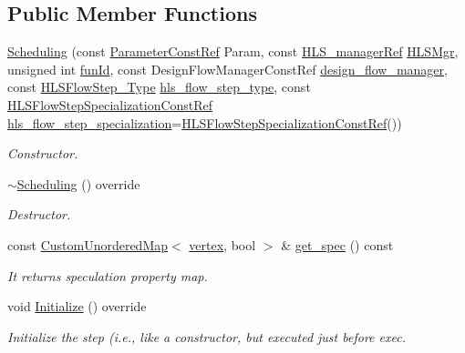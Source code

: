 \subsection*{Public Member Functions}
\begin{DoxyCompactItemize}
\item 
\hyperlink{classScheduling_ab64d824a1d85312cb1ac54ba91bb335f}{Scheduling} (const \hyperlink{Parameter_8hpp_a37841774a6fcb479b597fdf8955eb4ea}{Parameter\+Const\+Ref} Param, const \hyperlink{hls__manager_8hpp_acd3842b8589fe52c08fc0b2fcc813bfe}{H\+L\+S\+\_\+manager\+Ref} \hyperlink{classHLS__step_ade85003a99d34134418451ddc46a18e9}{H\+L\+S\+Mgr}, unsigned int \hyperlink{classHLSFunctionStep_a3e6434fd86c698b0c70520b859bff5b0}{fun\+Id}, const Design\+Flow\+Manager\+Const\+Ref \hyperlink{classDesignFlowStep_ab770677ddf087613add30024e16a5554}{design\+\_\+flow\+\_\+manager}, const \hyperlink{hls__step_8hpp_ada16bc22905016180e26fc7e39537f8d}{H\+L\+S\+Flow\+Step\+\_\+\+Type} \hyperlink{classHLS__step_aefd59af15346ec3f10bf12bd756e6777}{hls\+\_\+flow\+\_\+step\+\_\+type}, const \hyperlink{hls__step_8hpp_a5fdd2edf290c196531d21d68e13f0e74}{H\+L\+S\+Flow\+Step\+Specialization\+Const\+Ref} \hyperlink{classHLS__step_a843be75ba53b81876aa3c8b870ae8a55}{hls\+\_\+flow\+\_\+step\+\_\+specialization}=\hyperlink{hls__step_8hpp_a5fdd2edf290c196531d21d68e13f0e74}{H\+L\+S\+Flow\+Step\+Specialization\+Const\+Ref}())
\begin{DoxyCompactList}\small\item\em Constructor. \end{DoxyCompactList}\item 
\hyperlink{classScheduling_a943ed0dbb41df6925eebb44a33d8f74f}{$\sim$\+Scheduling} () override
\begin{DoxyCompactList}\small\item\em Destructor. \end{DoxyCompactList}\item 
const \hyperlink{custom__map_8hpp_ad1ed68f2ff093683ab1a33522b144adc}{Custom\+Unordered\+Map}$<$ \hyperlink{graph_8hpp_abefdcf0544e601805af44eca032cca14}{vertex}, bool $>$ \& \hyperlink{classScheduling_ada5eff4553c39bf5f6c58e75c86a130b}{get\+\_\+spec} () const
\begin{DoxyCompactList}\small\item\em It returns speculation property map. \end{DoxyCompactList}\item 
void \hyperlink{classScheduling_a178619eced00400e3a023a0b32784f8d}{Initialize} () override
\begin{DoxyCompactList}\small\item\em Initialize the step (i.\+e., like a constructor, but executed just before exec. \end{DoxyCompactList}\end{DoxyCompactItemize}
